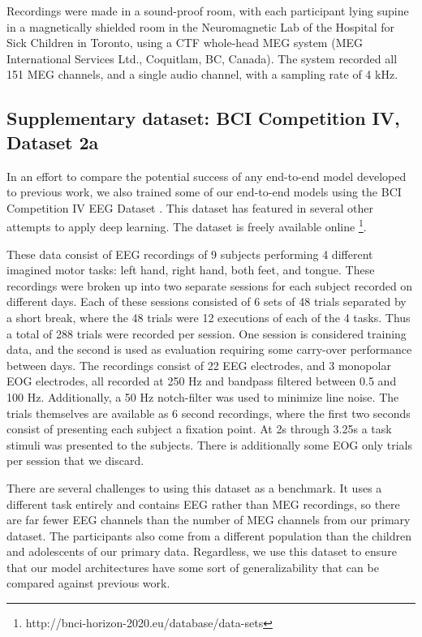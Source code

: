 \documentclass[utf8]{frontiersSCNS} %
\newcommand{\FR}[1]{{\small \textcolor{red}{\hl{FR: #1}}}}
\begin{document}
Recordings were made in a sound-proof room, with each participant lying supine in a magnetically shielded room in the Neuromagnetic Lab of the Hospital for Sick Children in Toronto, using a CTF whole-head MEG system (MEG International Services Ltd., Coquitlam, BC, Canada). The system recorded all 151 MEG channels, and a single audio channel, with a sampling rate of 4 kHz.

\subsection{Supplementary dataset: BCI Competition IV, Dataset 2a}

In an effort to compare the potential success of any end-to-end model developed to previous work, we also trained some of our end-to-end models using the BCI Competition IV EEG Dataset \cite{Tangermann2012}. This dataset has featured in several other attempts to apply deep learning. The dataset is freely available online \footnote{http://bnci-horizon-2020.eu/database/data-sets}.

These data consist of EEG recordings of 9 subjects performing 4 different imagined motor tasks: left hand, right hand, both feet, and tongue. These recordings were broken up into two separate sessions for each subject recorded on different days. Each of these sessions consisted of 6 sets of 48 trials separated by a short break, where the 48 trials were 12 executions of each of the 4 tasks. Thus a total of 288 trials were recorded per session. One session is considered training data, and the second is used as evaluation requiring some carry-over performance between days. The recordings consist of 22 EEG electrodes, and 3 monopolar EOG electrodes, all recorded at 250 Hz and bandpass filtered between 0.5 and 100 Hz. Additionally, a 50 Hz notch-filter was used to minimize line noise. The trials themselves are available as 6 second recordings, where the first two seconds consist of presenting each subject a fixation point. At 2s through 3.25s a task stimuli was presented to the subjects. There is additionally some EOG only trials per session that we discard. %

There are several challenges to using this dataset as a benchmark. It uses a different task entirely and contains EEG rather than MEG recordings, so there are far fewer EEG channels than the number of MEG channels from our primary dataset. The participants also come from a different population than the children and adolescents of our primary data. Regardless, we use this dataset to ensure that our model architectures have some sort of generalizability that can be compared against previous work. 
\end{document}
